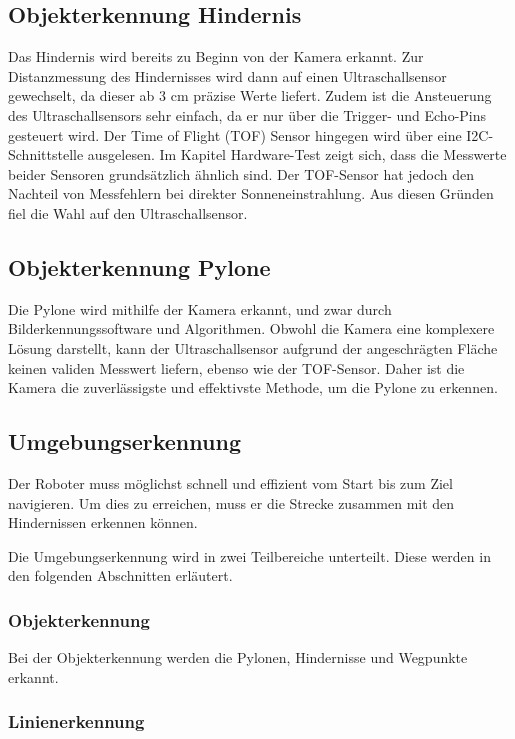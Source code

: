 \documentclass[../main.tex]{subfiles}
\begin{document}
\subsection{Objekterkennung Hindernis}
Das Hindernis wird bereits zu Beginn von der Kamera erkannt. Zur Distanzmessung des Hindernisses wird dann auf einen Ultraschallsensor gewechselt, da dieser ab 3 cm präzise Werte liefert. Zudem ist die Ansteuerung des Ultraschallsensors sehr einfach, da er nur über die Trigger- und Echo-Pins gesteuert wird. Der Time of Flight (TOF) Sensor hingegen wird über eine I2C-Schnittstelle ausgelesen. Im Kapitel Hardware-Test zeigt sich, dass die Messwerte beider Sensoren grundsätzlich ähnlich sind. Der TOF-Sensor hat jedoch den Nachteil von Messfehlern bei direkter Sonneneinstrahlung. Aus diesen Gründen fiel die Wahl auf den Ultraschallsensor.


\subsection{Objekterkennung Pylone}
Die Pylone wird mithilfe der Kamera erkannt, und zwar durch Bilderkennungssoftware und Algorithmen. Obwohl die Kamera eine komplexere Lösung darstellt, kann der Ultraschallsensor aufgrund der angeschrägten Fläche keinen validen Messwert liefern, ebenso wie der TOF-Sensor. Daher ist die Kamera die zuverlässigste und effektivste Methode, um die Pylone zu erkennen.

\subsection{Umgebungserkennung} %

Der Roboter muss möglichst schnell und effizient vom Start bis zum Ziel navigieren.
Um dies zu erreichen, muss er die Strecke zusammen mit den Hindernissen erkennen können.

Die Umgebungserkennung wird in zwei Teilbereiche unterteilt. Diese werden in den folgenden Abschnitten erläutert.

\subsubsection{Objekterkennung}

Bei der Objekterkennung werden die Pylonen, Hindernisse und Wegpunkte erkannt.

\subsubsection{Linienerkennung}
\end{document}
